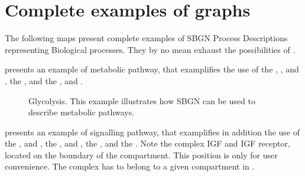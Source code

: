 \chapter{Complete examples of \SBGNPDLone graphs}

The following maps present complete examples of SBGN Process Descriptions representing Biological processes. They by no mean exhaust the possibilities of  \SBGNPDLone.

 presents an example of metabolic pathway, that examplifies the use of the  , , and , the  , and the  ,  and .

\begin{figure}[htb]
\begin{center}
\caption{Glycolysis. This example illustrates how SBGN can be used to describe metabolic pathways.}\label{fig:glycolysis}
\end{center}
\end{figure}

 presents an example of signalling pathway, that examplifies in addition the use of the  , and , the  ,  and , the  , and the  . Note the complex IGF and IGF receptor, located on the boundary of the compartment. This position is only for user convenience. The complex has to belong to a given compartment in \SBGNPDLone.

